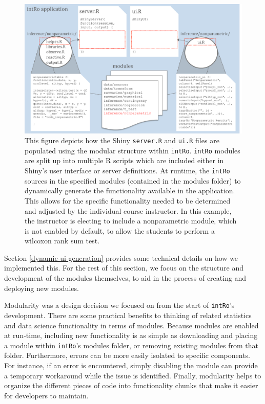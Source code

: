 \documentclass[12pt,]{article}
\begin{document}
\begin{figure}[ht!]
\centering
\includegraphics[width=\linewidth]{images/app_creation_modules.pdf}
\caption{This figure depicts how the Shiny \texttt{server.R} and \texttt{ui.R} files are populated using the modular structure within \texttt{intRo}. \texttt{intRo} modules are split up into multiple R scripts which are included either in Shiny's user interface or server definitions. At runtime, the \texttt{intRo} sources in the specified modules (contained in the modules folder) to dynamically generate the functionality available in the application. This allows for the specific functionality needed to be determined and adjusted by the individual course instructor. In this example, the instructor is electing to include a nonparametric module, which is not enabled by default, to allow the students to perform a wilcoxon rank sum test.}
\label{fig:app_creation_modules}
\end{figure}

Section \ref{dynamic-ui-generation} provides some technical details on
how we implemented this. For the rest of this section, we focus on the
structure and development of the modules themselves, to aid in the
process of creating and deploying new modules.

Modularity was a design decision we focused on from the start of
\texttt{intRo}'s development. There are some practical benefits to
thinking of related statistics and data science functionality in terms
of modules. Because modules are enabled at run-time, including new
functionality is as simple as downloading and placing a module within
\texttt{intRo}'s modules folder, or removing existing modules from that
folder. Furthermore, errors can be more easily isolated to specific
components. For instance, if an error is encountered, simply disabling
the module can provide a temporary workaround while the issue is
identified. Finally, modularity helps to organize the different pieces
of code into functionality chunks that make it easier for developers to
maintain.
\end{document}

